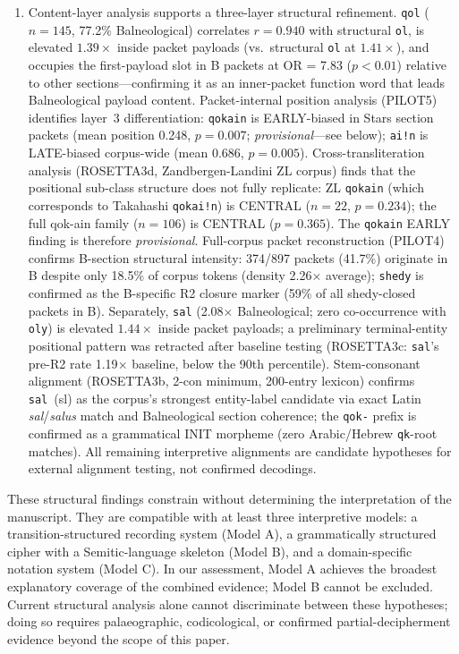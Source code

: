 \documentclass[11pt,a4paper,twocolumn]{article}
\begin{document}
\begin{enumerate}[leftmargin=*,itemsep=2pt]
    \item Content-layer analysis supports a three-layer structural refinement. \texttt{qol} ($n = 145$, 77.2\% Balneological) correlates $r = 0.940$ with structural \texttt{ol}, is elevated $1.39\times$ inside packet payloads (vs.\ structural \texttt{ol} at $1.41\times$), and occupies the first-payload slot in B packets at OR = 7.83 ($p < 0.01$) relative to other sections---confirming it as an inner-packet function word that leads Balneological payload content. Packet-internal position analysis (PILOT5) identifies layer~3 differentiation: \texttt{qokain} is EARLY-biased in Stars section packets (mean position 0.248, $p = 0.007$; \textit{provisional}---see below); \texttt{ai!n} is LATE-biased corpus-wide (mean 0.686, $p = 0.005$). Cross-transliteration analysis (ROSETTA3d, Zandbergen-Landini ZL corpus) finds that the positional sub-class structure does not fully replicate: ZL \texttt{qokain} (which corresponds to Takahashi \texttt{qokai!n}) is CENTRAL ($n=22$, $p=0.234$); the full qok-ain family ($n=106$) is CENTRAL ($p=0.365$). The \texttt{qokain} EARLY finding is therefore \textit{provisional}. Full-corpus packet reconstruction (PILOT4) confirms B-section structural intensity: 374/897 packets (41.7\%) originate in B despite only 18.5\% of corpus tokens (density 2.26$\times$ average); \texttt{shedy} is confirmed as the B-specific R2 closure marker (59\% of all shedy-closed packets in B). Separately, \texttt{sal} (2.08$\times$ Balneological; zero co-occurrence with \texttt{oly}) is elevated $1.44\times$ inside packet payloads; a preliminary terminal-entity positional pattern was retracted after baseline testing (ROSETTA3c: \texttt{sal}'s pre-R2 rate 1.19$\times$ baseline, below the 90th percentile). Stem-consonant alignment (ROSETTA3b, 2-con minimum, 200-entry lexicon) confirms \texttt{sal}~(sl) as the corpus's strongest entity-label candidate via exact Latin \textit{sal}/\textit{salus} match and Balneological section coherence; the \texttt{qok-} prefix is confirmed as a grammatical INIT morpheme (zero Arabic/Hebrew \texttt{qk}-root matches). All remaining interpretive alignments are candidate hypotheses for external alignment testing, not confirmed decodings.
\end{enumerate}

\noindent These structural findings constrain without determining the interpretation of the manuscript. They are compatible with at least three interpretive models: a transition-structured recording system (Model A), a grammatically structured cipher with a Semitic-language skeleton (Model B), and a domain-specific notation system (Model C). In our assessment, Model A achieves the broadest explanatory coverage of the combined evidence; Model B cannot be excluded. Current structural analysis alone cannot discriminate between these hypotheses; doing so requires palaeographic, codicological, or confirmed partial-decipherment evidence beyond the scope of this paper.
\end{document}
